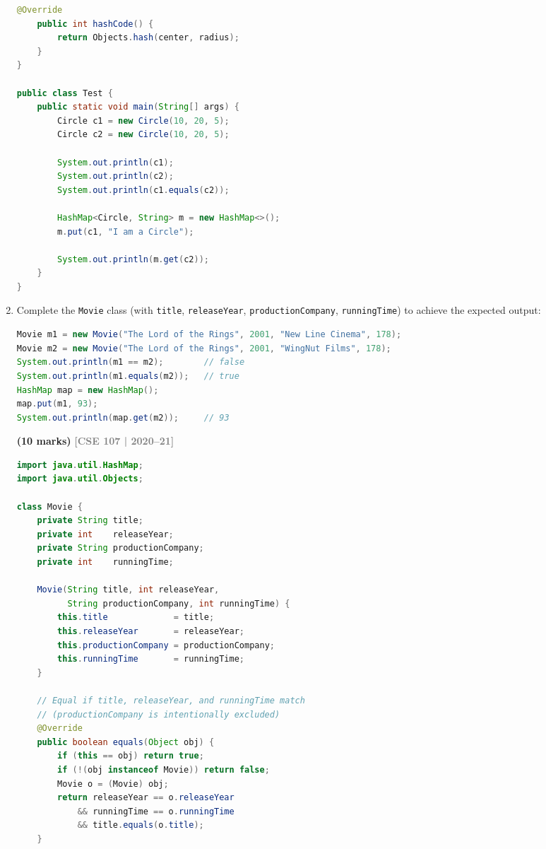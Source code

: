 \documentclass[12pt,a3paper]{article}
\newcommand{\yr}[1]{\hfill\textcolor{gray}{\small\textbf{[#1]}}}
\newcommand{\mk}[1]{\textcolor{orange!70!black}{\small\textbf{(#1 marks)}}}
\begin{document}
\begin{enumerate}
\begin{tcolorbox}[enhanced,breakable,ansbox,
  colback=cC!4,colframe=cC,boxrule=0.8pt,arc=5pt,
  title={\textbf{Answer --- Point and Circle Classes}},
  fonttitle=\bfseries\color{white},colbacktitle=cC]
\begin{lstlisting}[language=Java]
    @Override
    public int hashCode() {
        return Objects.hash(center, radius);
    }
}

public class Test {
    public static void main(String[] args) {
        Circle c1 = new Circle(10, 20, 5);
        Circle c2 = new Circle(10, 20, 5);

        System.out.println(c1);
        System.out.println(c2);
        System.out.println(c1.equals(c2));

        HashMap<Circle, String> m = new HashMap<>();
        m.put(c1, "I am a Circle");

        System.out.println(m.get(c2));
    }
}
\end{lstlisting}
\end{tcolorbox}

\item Complete the \texttt{Movie} class (with \texttt{title}, \texttt{releaseYear}, \texttt{productionCompany}, \texttt{runningTime}) to achieve the expected output:
\begin{lstlisting}[language=Java]
Movie m1 = new Movie("The Lord of the Rings", 2001, "New Line Cinema", 178);
Movie m2 = new Movie("The Lord of the Rings", 2001, "WingNut Films", 178);
System.out.println(m1 == m2);        // false
System.out.println(m1.equals(m2));   // true
HashMap map = new HashMap();
map.put(m1, 93);
System.out.println(map.get(m2));     // 93
\end{lstlisting}
\mk{10}
\yr{CSE 107 | 2020--21}

\begin{tcolorbox}[enhanced,breakable,ansbox,
  colback=cC!4,colframe=cC,boxrule=0.8pt,arc=5pt,
  title={\textbf{Answer --- Movie Class: equals and hashCode for HashMap}},
  fonttitle=\bfseries\color{white},colbacktitle=cC]
\begin{lstlisting}[language=Java]
import java.util.HashMap;
import java.util.Objects;

class Movie {
    private String title;
    private int    releaseYear;
    private String productionCompany;
    private int    runningTime;

    Movie(String title, int releaseYear,
          String productionCompany, int runningTime) {
        this.title             = title;
        this.releaseYear       = releaseYear;
        this.productionCompany = productionCompany;
        this.runningTime       = runningTime;
    }

    // Equal if title, releaseYear, and runningTime match
    // (productionCompany is intentionally excluded)
    @Override
    public boolean equals(Object obj) {
        if (this == obj) return true;
        if (!(obj instanceof Movie)) return false;
        Movie o = (Movie) obj;
        return releaseYear == o.releaseYear
            && runningTime == o.runningTime
            && title.equals(o.title);
    }


\end{lstlisting}
\end{tcolorbox}
\end{enumerate}
\end{document}
